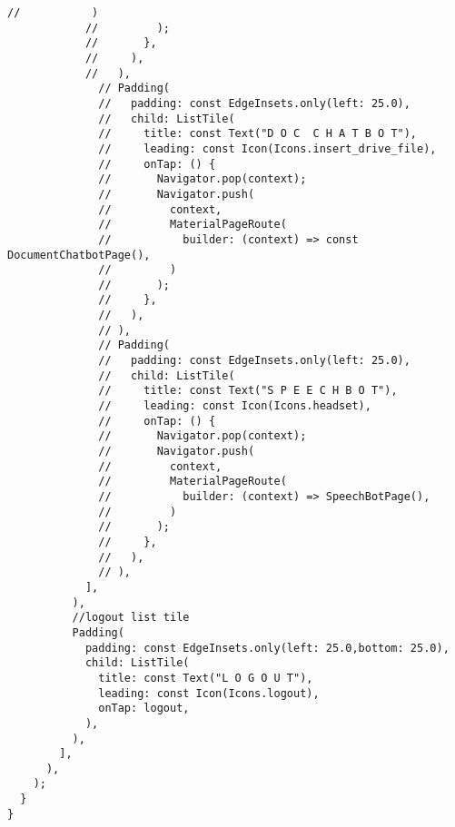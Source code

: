 \begin{lstlisting}[style=pythonstyle,caption={Codice del my\_drawer.dart}, label={lst:drawer}]
            //           )
            //         );
            //       },
            //     ),
            //   ),
              // Padding(
              //   padding: const EdgeInsets.only(left: 25.0),
              //   child: ListTile(
              //     title: const Text("D O C  C H A T B O T"),
              //     leading: const Icon(Icons.insert_drive_file),
              //     onTap: () {
              //       Navigator.pop(context);
              //       Navigator.push(
              //         context,
              //         MaterialPageRoute(
              //           builder: (context) => const DocumentChatbotPage(),
              //         )
              //       );
              //     },
              //   ),
              // ),
              // Padding(
              //   padding: const EdgeInsets.only(left: 25.0),
              //   child: ListTile(
              //     title: const Text("S P E E C H B O T"),
              //     leading: const Icon(Icons.headset),
              //     onTap: () {
              //       Navigator.pop(context);
              //       Navigator.push(
              //         context,
              //         MaterialPageRoute(
              //           builder: (context) => SpeechBotPage(),
              //         )
              //       );
              //     },
              //   ),
              // ),
            ],
          ),
          //logout list tile
          Padding(
            padding: const EdgeInsets.only(left: 25.0,bottom: 25.0),
            child: ListTile(
              title: const Text("L O G O U T"),
              leading: const Icon(Icons.logout),
              onTap: logout,
            ),
          ),
        ],
      ),
    );
  }
}
\end{lstlisting}
